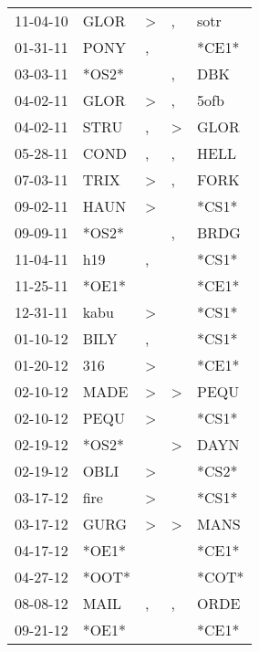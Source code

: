 \begin{supertabular}{lllll}
 11-04-10 &   GLOR &     \textgreater &                , &   sotr \\
 01-31-11 &   PONY &                , &                  &  *CE1* \\
 03-03-11 &  *OS2* &                  &                , &    DBK \\
 04-02-11 &   GLOR &     \textgreater &                , &   5ofb \\
 04-02-11 &   STRU &                , &     \textgreater &   GLOR \\
 05-28-11 &   COND &                , &                , &   HELL \\
 07-03-11 &   TRIX &     \textgreater &                , &   FORK \\
 09-02-11 &   HAUN &     \textgreater &                  &  *CS1* \\
 09-09-11 &  *OS2* &                  &                , &   BRDG \\
 11-04-11 &    h19 &                , &                  &  *CS1* \\
 11-25-11 &  *OE1* &                  &                  &  *CE1* \\
 12-31-11 &   kabu &     \textgreater &                  &  *CS1* \\
 01-10-12 &   BILY &                , &                  &  *CS1* \\
 01-20-12 &    316 &     \textgreater &                  &  *CE1* \\
 02-10-12 &   MADE &     \textgreater &     \textgreater &   PEQU \\
 02-10-12 &   PEQU &     \textgreater &                  &  *CS1* \\
 02-19-12 &  *OS2* &                  &     \textgreater &   DAYN \\
 02-19-12 &   OBLI &     \textgreater &                  &  *CS2* \\
 03-17-12 &   fire &     \textgreater &                  &  *CS1* \\
 03-17-12 &   GURG &     \textgreater &     \textgreater &   MANS \\
 04-17-12 &  *OE1* &                  &                  &  *CE1* \\
 04-27-12 &  *OOT* &                  &                  &  *COT* \\
 08-08-12 &   MAIL &                , &                , &   ORDE \\
 09-21-12 &  *OE1* &                  &                  &  *CE1* \\

\end{supertabular}
